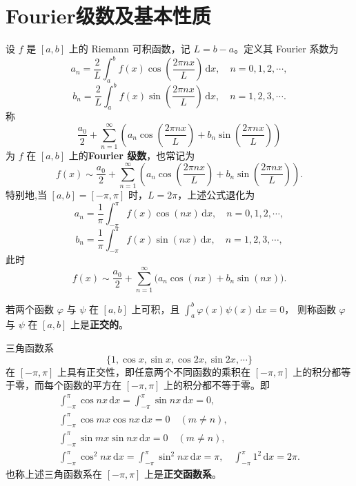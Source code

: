 \documentclass[../../main.tex]{subfiles}%
\begin{document}
\section{Fourier级数及基本性质}

\begin{definition}
设 $f$ 是 $[a,b]$ 上的 Riemann 可积函数，记 $L=b-a$。定义其 Fourier 系数为
\[
a_n = \frac{2}{L}\int_a^b f(x)\cos\left(\frac{2\pi n x}{L}\right)\,\mathrm{d}x,\quad n=0,1,2,\cdots,
\]
\[
b_n = \frac{2}{L}\int_a^b f(x)\sin\left(\frac{2\pi n x}{L}\right)\,\mathrm{d}x,\quad n=1,2,3,\cdots.
\]
称
\[
\frac{a_0}{2}+\sum_{n=1}^{\infty}\left(a_n\cos\left(\frac{2\pi n x}{L}\right)+b_n\sin\left(\frac{2\pi n x}{L}\right)\right)
\]
为 $f$ 在 $[a,b]$ 上的\textbf{Fourier 级数}，也常记为
\[
f(x)\sim \frac{a_0}{2}+\sum_{n=1}^{\infty}\left(a_n\cos\left(\frac{2\pi n x}{L}\right)+b_n\sin\left(\frac{2\pi n x}{L}\right)\right).
\]
特别地,当 $[a,b]=[-\pi,\pi]$ 时，$L=2\pi$，上述公式退化为
\[
a_n = \frac{1}{\pi}\int_{-\pi}^{\pi} f(x)\cos(nx)\,\mathrm{d}x,\quad n=0,1,2,\cdots,
\]
\[
b_n = \frac{1}{\pi}\int_{-\pi}^{\pi} f(x)\sin(nx)\,\mathrm{d}x,\quad n=1,2,3,\cdots,
\]
此时
\[
f(x)\sim \frac{a_0}{2}+\sum_{n=1}^{\infty}\bigl(a_n\cos(nx)+b_n\sin(nx)\bigr).
\]
\end{definition}

\begin{definition}
若两个函数 $\varphi$ 与 $\psi$ 在 $[a, b]$ 上可积，且
$\int_a^b \varphi(x)\psi(x)\,\mathrm{d}x = 0$，
则称函数 $\varphi$ 与 $\psi$ 在 $[a, b]$ 上是\textbf{正交的}。
\end{definition}

\begin{proposition}[三角函数系的正交性]\label{proposition:三角函数系的正交性}
三角函数系
$$\{1, \cos x, \sin x, \cos 2x, \sin 2x, \cdots\}$$
在 $[-\pi, \pi]$ 上具有正交性，即任意两个不同函数的乘积在 $[-\pi, \pi]$ 上的积分都等于零，而每个函数的平方在 $[-\pi, \pi]$ 上的积分都不等于零。即
\begin{gather*}
\int_{-\pi}^{\pi} \cos nx \,\mathrm{d}x = \int_{-\pi}^{\pi} \sin nx \,\mathrm{d}x = 0, \\
\int_{-\pi}^{\pi} \cos mx \cos nx \,\mathrm{d}x = 0 \quad (m \neq n), \\
\int_{-\pi}^{\pi} \sin mx \sin nx \,\mathrm{d}x = 0 \quad (m \neq n), \\
\int_{-\pi}^{\pi} \cos^2 nx \,\mathrm{d}x = \int_{-\pi}^{\pi} \sin^2 nx \,\mathrm{d}x = \pi, \quad \int_{-\pi}^{\pi} 1^2 \,\mathrm{d}x = 2\pi.
\end{gather*}
也称上述三角函数系在 $[-\pi, \pi]$ 上是\textbf{正交函数系}。
\end{proposition}
\end{document}
